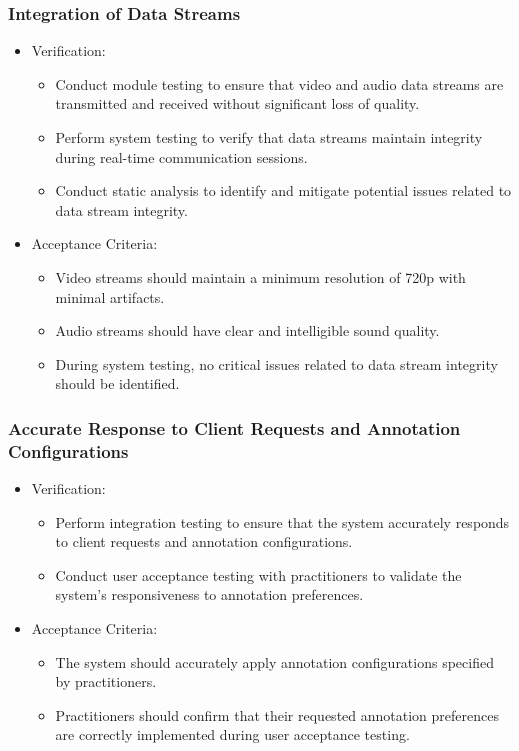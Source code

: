 \documentclass[12pt]{article}
\begin{document}
\subsubsection{Integration of Data Streams}
\begin{itemize}
    \item Verification:
        \begin{itemize}
            \item Conduct module testing to ensure that video and audio data streams are transmitted and received without significant loss of quality.
            \item Perform system testing to verify that data streams maintain integrity during real-time communication sessions.
            \item Conduct static analysis to identify and mitigate potential issues related to data stream integrity.
        \end{itemize}
    \item Acceptance Criteria:
        \begin{itemize}
            \item Video streams should maintain a minimum resolution of 720p with minimal artifacts.
            \item Audio streams should have clear and intelligible sound quality.
            \item During system testing, no critical issues related to data stream integrity should be identified.
        \end{itemize}
\end{itemize}
\subsubsection{Accurate Response to Client Requests and Annotation Configurations}
\begin{itemize}
    \item Verification:
        \begin{itemize}
            \item Perform integration testing to ensure that the system accurately responds to client requests and annotation configurations.
            \item Conduct user acceptance testing with practitioners to validate the system’s responsiveness to annotation preferences.
        \end{itemize}
    \item Acceptance Criteria:
        \begin{itemize}
            \item The system should accurately apply annotation configurations specified by practitioners.
            \item Practitioners should confirm that their requested annotation preferences are correctly implemented during user acceptance testing.
        \end{itemize}
\end{itemize}
\end{document}
